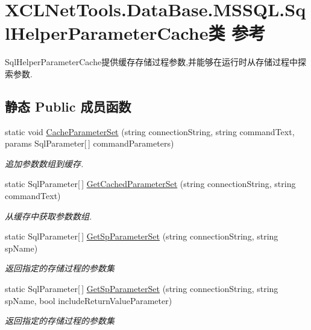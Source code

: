 \hypertarget{class_x_c_l_net_tools_1_1_data_base_1_1_m_s_s_q_l_1_1_sql_helper_parameter_cache}{\section{X\-C\-L\-Net\-Tools.\-Data\-Base.\-M\-S\-S\-Q\-L.\-Sql\-Helper\-Parameter\-Cache类 参考}
\label{class_x_c_l_net_tools_1_1_data_base_1_1_m_s_s_q_l_1_1_sql_helper_parameter_cache}
}


Sql\-Helper\-Parameter\-Cache提供缓存存储过程参数,并能够在运行时从存储过程中探索参数.  


\subsection*{静态 Public 成员函数}
\begin{DoxyCompactItemize}
\item 
static void \hyperlink{class_x_c_l_net_tools_1_1_data_base_1_1_m_s_s_q_l_1_1_sql_helper_parameter_cache_a4c9d3ea3efdc1a0c29c522ad7fde1900}{Cache\-Parameter\-Set} (string connection\-String, string command\-Text, params Sql\-Parameter\mbox{[}$\,$\mbox{]} command\-Parameters)
\begin{DoxyCompactList}\small\item\em 追加参数数组到缓存. \end{DoxyCompactList}\item 
static Sql\-Parameter\mbox{[}$\,$\mbox{]} \hyperlink{class_x_c_l_net_tools_1_1_data_base_1_1_m_s_s_q_l_1_1_sql_helper_parameter_cache_a6003ff6a4a36764733a6487d083458b7}{Get\-Cached\-Parameter\-Set} (string connection\-String, string command\-Text)
\begin{DoxyCompactList}\small\item\em 从缓存中获取参数数组. \end{DoxyCompactList}\item 
static Sql\-Parameter\mbox{[}$\,$\mbox{]} \hyperlink{class_x_c_l_net_tools_1_1_data_base_1_1_m_s_s_q_l_1_1_sql_helper_parameter_cache_a58ac469fef0b1bfbe5d246c29d04a885}{Get\-Sp\-Parameter\-Set} (string connection\-String, string sp\-Name)
\begin{DoxyCompactList}\small\item\em 返回指定的存储过程的参数集 \end{DoxyCompactList}\item 
static Sql\-Parameter\mbox{[}$\,$\mbox{]} \hyperlink{class_x_c_l_net_tools_1_1_data_base_1_1_m_s_s_q_l_1_1_sql_helper_parameter_cache_a7890bc8805a1a41b5934963c58d98771}{Get\-Sp\-Parameter\-Set} (string connection\-String, string sp\-Name, bool include\-Return\-Value\-Parameter)
\begin{DoxyCompactList}\small\item\em 返回指定的存储过程的参数集 \end{DoxyCompactList}\end{DoxyCompactItemize}


